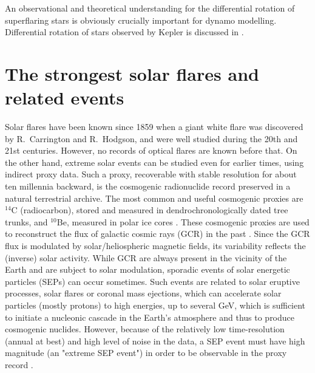 \documentclass[fleqn,12pt]{SelfArx} %
\begin{document}
An observational and theoretical understanding for the differential rotation of superflaring stars is obviously 
crucially important for dynamo modelling. Differential rotation of stars observed by Kepler is discussed in \cite{14}.



\section{The strongest solar flares and related events}
\label{strong}

Solar flares have been known since 1859 when a giant white flare was discovered by R.~Carrington and R.~Hodgson, 
and were well studied during the 20th and 21st centuries. However, no records of optical flares are known before 
that. On the other hand, extreme solar events can be studied even for earlier times, using indirect proxy data.
Such a proxy, recoverable with stable resolution for about ten millennia backward, is the cosmogenic radionuclide 
record preserved in a natural terrestrial archive.
The most common and useful cosmogenic proxies are $^{14}$C (radiocarbon), stored
and measured in dendrochronologically dated tree trunks, and $^{10}$Be, measured in polar ice cores \cite{15}.
These cosmogenic proxies are used to reconstruct the flux of galactic cosmic rays (GCR) in the past \cite{16}.
Since the GCR flux is modulated by solar/heliospheric magnetic fields, its variability reflects the (inverse) 
solar activity.
While GCR are always present in the vicinity of the  Earth and are subject to solar modulation, sporadic events 
of solar energetic particles (SEPs) can occur sometimes.
Such events are related to solar eruptive processes, solar flares or coronal mass ejections, which can accelerate 
solar particles (mostly protons) to high energies, up to several GeV, which is sufficient to initiate a nucleonic 
cascade in the Earth's atmosphere and thus to produce cosmogenic nuclides.
However, because of the relatively low time-resolution (annual at best) and high level of noise in the data,
a SEP event must have high magnitude (an "extreme SEP event") in order to be observable in the proxy record \cite{17}.
\end{document}
